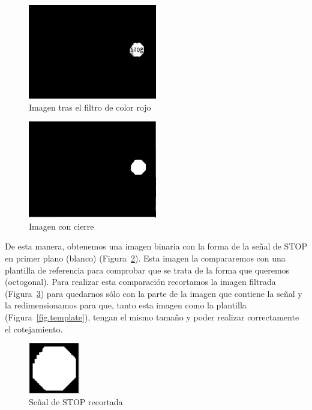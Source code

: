 \begin{figure}[H]
  \begin{center}
    \includegraphics[width=0.5\textwidth]{figures/Stop/colorFilterRed.jpg}
		\caption{Imagen tras el filtro de color rojo}
		\label{fig.colorFilterRed}
		\end{center}
\end{figure}

\begin{figure}[H]
  \begin{center}
    \includegraphics[width=0.5\textwidth]{figures/Stop/close.jpg}
		\caption{Imagen con cierre}
		\label{fig.close}
		\end{center}
\end{figure}


De esta manera, obtenemos una imagen binaria con la forma de la señal de STOP en primer plano (blanco) (Figura~\ref{fig.close}). Esta imagen la compararemos con una plantilla de referencia para comprobar que se trata de la forma que queremos (octogonal). Para realizar esta comparación recortamos la imagen filtrada (Figura~\ref{fig.cut}) para quedarnos sólo con la parte de la imagen que contiene la señal y la redimensionamos para que, tanto esta imagen como la plantilla (Figura~\ref{fig.template}), tengan el mismo tamaño y poder realizar correctamente el cotejamiento. \\

\begin{figure}[H]
  \begin{center}
    \includegraphics[width=0.2\textwidth]{figures/Stop/cut.jpg}
		\caption{Señal de STOP recortada}
		\label{fig.cut}
		\end{center}
\end{figure}

